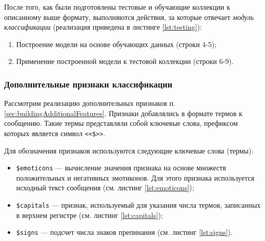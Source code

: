     После того, как были подготовлены тестовые и обучающие коллекции к
    описанному выше формату, выполняются действия, за которые
    отвечает {\it модуль классификации} (реализация приведена в листинге
    \ref{lst:testing}):
    \begin{enumerate}
        \item Построение модели на основе обучающих данных (строки 4-5);
        \item Применение построенной модели к тестовой коллекции (строки 6-9).
    \end{enumerate}

    \lstset{style=python}
    


    \subsubsection{Дополнительные признаки классификации}
    Рассмотрим реализацию дополнительных признаков п.
    \ref{sec:buildingAdditionalFeatures}.
    Признаки добавлялись в формате термов к сообщению.
    Такие термы представляли собой ключевые слова, префиксом которых является
    символ {\tt <<\$>>}.

    Для обозначения признаков используются следующие ключевые слова (термы):
    \begin{itemize}
        \item {\tt \$emoticons} --- вычисление значения признака на основе
            множеств положительных и негативных эмотиконов.
            Для этого признака используется исходный текст сообщения
            (см. листинг \ref{lst:emoticons});
        \item {\tt \$capitals} --- признак, используемый для указания числа термов,
            записанных в верхнем регистре (см. листинг \ref{lst:capitals});

        \item {\tt \$signs} --- подсчет числа знаков препинания (см. листинг
            \ref{lst:signs}).
    \end{itemize}


